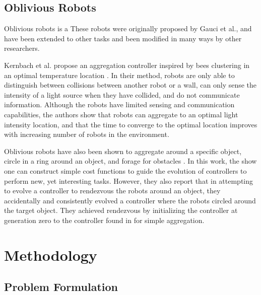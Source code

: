 \documentclass[conference]{IEEEtran}
\begin{document}
  \subsection{Oblivious Robots}

    Oblivious robots is a These robots were originally proposed by Gauci et al., and have been extended to other tasks and been modified in many ways by other researchers.

    Kernbach et al. propose an aggregation controller inspired by bees clustering in an optimal temperature location \cite{kernbach_re-embodiment_2009}. In their method, robots are only able to distinguish between collisions between another robot or a wall, can only sense the intensity of a light source when they have collided, and do not communicate information. Although the robots have limited sensing and communication capabilities, the authors show that robots can aggregate to an optimal light intensity location, and that the time to converge to the optimal location improves with increasing number of robots in the environment.

    Oblivious robots have also been shown to aggregate around a specific object, circle in a ring around an object, and forage for obstacles \cite{johnson_evolving_2016}. In this work, the show one can construct simple cost functions to guide the evolution of controllers to perform new, yet interesting tasks. However, they also report that in attempting to evolve a controller to rendezvous the robots around an object, they accidentally and consistently evolved a controller where the robots circled around the target object. They achieved rendezvous by initializing the controller at generation zero to the controller found in \cite{gauci_self-organized_2014} for simple aggregation.

\section{Methodology}

\subsection{Problem Formulation}
\end{document}
